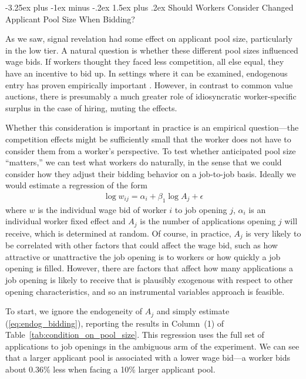 \documentclass[12pt]{article}
\makeatletter
\renewcommand{\subsection}{%
  \@startsection{subsection}{2}{\z@}%
  {-3.25ex plus -1ex minus -.2ex}%
  {1.5ex plus .2ex}%
  {\normalfont\large\bfseries}%
}
\makeatother
\begin{document}
\bigskip

\subsection{Should Workers Consider Changed Applicant Pool Size When Bidding?} \label{supp_app:condition_on_pool_size}

As we saw, signal revelation had some effect on applicant pool size, particularly in the low tier.
A natural question is whether these different pool sizes influenced wage bids.
If workers thought they faced less competition, all else equal, they have an incentive to bid up.
In settings where it can be examined, endogenous entry has proven empirically important \citep{bajari2003winner}. However, in contrast to common value auctions, there is presumably a much greater role of idiosyncratic worker-specific surplus in the case of hiring, muting the effects.  

Whether this consideration is important in practice is an empirical question---the competition effects might be sufficiently small that the worker does not have to consider them from a worker's perspective.
To test whether anticipated pool size ``matters,'' we can test what workers do naturally, in the sense that we could consider how they adjust their bidding behavior on a job-to-job basis. 
Ideally we would estimate a regression of the form 
\begin{align} \label{eq:endog_bidding}
  \log w_{ij} = \alpha_i + \beta_1 \log A_{j} + \epsilon
\end{align} 
where $w$ is the individual wage bid of worker $i$ to job opening $j$, $\alpha_i$ is an individual worker fixed effect and $A_j$ is the number of applications opening $j$ will receive, which is determined at random.
Of course, in practice, $A_j$ is very likely to be correlated with other factors that could affect the wage bid, such as how attractive or unattractive the job opening is to workers or how quickly a job opening is filled.
However, there are factors that affect how many applications a job opening is likely to receive that is plausibly exogenous with respect to other opening characteristics, and so an instrumental variables approach is feasible. 

To start, we ignore the endogeneity of $A_j$ and simply estimate (\ref{eq:endog_bidding}), reporting the results in Column~(1) of Table~\ref{tab:condition_on_pool_size}.
This regression uses the full set of applications to job openings in the ambiguous arm of the experiment.
We can see that a larger applicant pool is associated with a lower wage bid---a worker bids about 0.36\% less when facing a 10\% larger applicant pool. 
\end{document}
